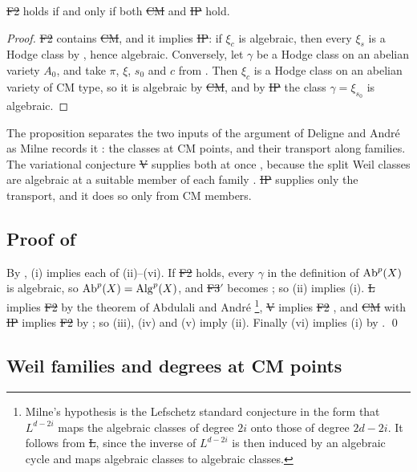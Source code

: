 \begin{proposition}\label{prop:cmip}
\st{F2} holds if and only if both \st{CM} and \st{IP} hold.
\end{proposition}

\begin{proof}
\st{F2} contains \st{CM}, and it implies \st{IP}: if $\xi_{c}$ is algebraic,
then every $\xi_{s}$ is a Hodge class by , hence algebraic.
Conversely, let $\gamma$ be a Hodge class on an abelian variety $A_{0}$, and
take $\pi$, $\xi$, $s_{0}$ and $c$ from . Then $\xi_{c}$
is a Hodge class on an abelian variety of CM type, so it is algebraic by
\st{CM}, and by \st{IP} the class $\gamma=\xi_{s_{0}}$ is algebraic.
\end{proof}

The proposition separates the two inputs of the argument of Deligne and
Andr\'e as Milne records it \cite[\S5]{Mil20}: the classes at CM points, and
their transport along families. The variational conjecture \st{V} supplies
both at once \cite[Theorem~3 and Remark~2]{Mil20}, because the split Weil
classes are algebraic at a suitable member of each family
\cite[4.8]{Del82}. \st{IP} supplies only the transport, and it does so only
from CM members.

\subsection{Proof of \texorpdfstring{}{Theorem C}}\label{ssec:proofequiv}
By , (i) implies each of (ii)--(vi). If \st{F2} holds,
every $\gamma$ in the definition of $\operatorname{Ab}^{p}(X)$ is algebraic, so
$\operatorname{Ab}^{p}(X)=\operatorname{Alg}^{p}(X)$, and \st{F3$'$} becomes \HC; so (ii) implies (i).
\st{L} implies \st{F2} by the theorem of Abdulali and Andr\'e
\cite[Theorem~4]{Mil20}\footnote{Milne's hypothesis is the Lefschetz
standard conjecture in the form that $L^{d-2i}$ maps the algebraic classes
of degree $2i$ onto those of degree $2d-2i$. It follows from \st{L}, since
the inverse of $L^{d-2i}$ is then induced by an algebraic cycle and maps
algebraic classes to algebraic classes.}, \st{V} implies \st{F2}
\cite[Theorem~3 and Remark~2]{Mil20}, and \st{CM} with \st{IP} implies
\st{F2} by ; so (iii), (iv) and (v) imply (ii). Finally (vi)
implies (i) by . \qed

\subsection{Weil families and degrees at CM points}\label{ssec:weilfamilies}

